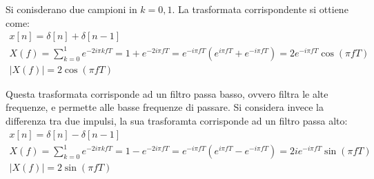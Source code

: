 \documentclass{article}
\numberwithin{equation}{subsection}
\begin{document}
Si conisderano due campioni in $k=0,1$. La trasformata corrispondente si ottiene come:
\begin{gather*}
    x[n]=\delta[n]+\delta[n-1]\\
    X(f)=\displaystyle\sum_{k=0}^1e^{-2i\pi kfT}=1+e^{-2i\pi fT}=e^{-i\pi fT}\left(e^{i\pi fT}+e^{-i\pi fT}\right)=2e^{-i\pi fT}\cos(\pi fT)\\
    |X(f)|=2\cos(\pi fT)
\end{gather*}
\begin{center}
\end{center}


Questa trasformata corrisponde ad un filtro passa basso, ovvero filtra le alte frequenze, e permette alle basse frequenze di passare. Si considera invece la differenza 
tra due impulsi, la sua trasforamta corrisponde ad un filtro passa alto:
\begin{gather*}
    x[n]=\delta[n]-\delta[n-1]\\
    X(f)=\displaystyle\sum_{k=0}^1e^{-2i\pi kfT}=1-e^{-2i\pi fT}=e^{-i\pi fT}\left(e^{i\pi fT}-e^{-i\pi fT}\right)=2ie^{-i\pi fT}\sin(\pi fT)\\
    |X(f)|=2\sin(\pi fT)
\end{gather*}
\begin{center}
\end{center}
\end{document}
